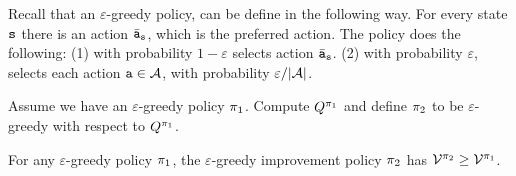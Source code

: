 Recall that an $\varepsilon$-greedy policy, can be define in the
following way. For every state ${\tt s}$ there is an action
$\bar{{\tt a}}_{\tt s}$, which is the preferred action. The policy
does the following: (1) with probability $1-\varepsilon$ selects action $\bar{{\tt a}}_{\tt s}$. (2) with probability $\varepsilon$, selects
each action ${\tt a} \in \mathcal{A}$, with probability
$\varepsilon/|\mathcal{A}|$.

Assume we have an $\varepsilon$-greedy policy $\pi_1$. Compute
$Q^{\pi_1}$ and define $\pi_2$ to be $\varepsilon$-greedy
with respect to $Q^{\pi_1}$.

\begin{theorem}
For any $\varepsilon$-greedy policy $\pi_1$, the
$\varepsilon$-greedy improvement policy $\pi_2$ has
$\mathcal{V}^{\pi_2}\geq \mathcal{V}^{\pi_1}$.
\end{theorem}

